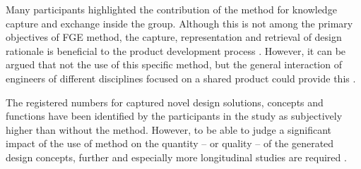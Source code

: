 \documentclass[aerospace,article,submit,moreauthors,pdftex]{Definitions/mdpi}
\newcommand{\Jakob}[1]{{{\color{orange}{\itshape{#1}}\color{black}}
    }{\ignorespaces}}
\begin{document}
Many participants highlighted the contribution of the method for knowledge capture and exchange inside the group.
Although this is not among the primary objectives of \ac{FGE} method, the capture, representation and retrieval of design rationale is beneficial to the product development process \cite{Stokes2001}.
However, it can be argued that not the use of this specific method, but the general interaction of engineers of different disciplines focused on a shared product could provide this \cite{Tayal2012}.



The registered numbers for captured novel design solutions, concepts and functions have been identified by the participants in the study as subjectively higher than without the method.
However, to be able to judge a significant impact of the use of method on the quantity -- or quality -- of the generated design concepts, further and especially more longitudinal studies are required \cite{Blessing2009}. 
\end{document}
